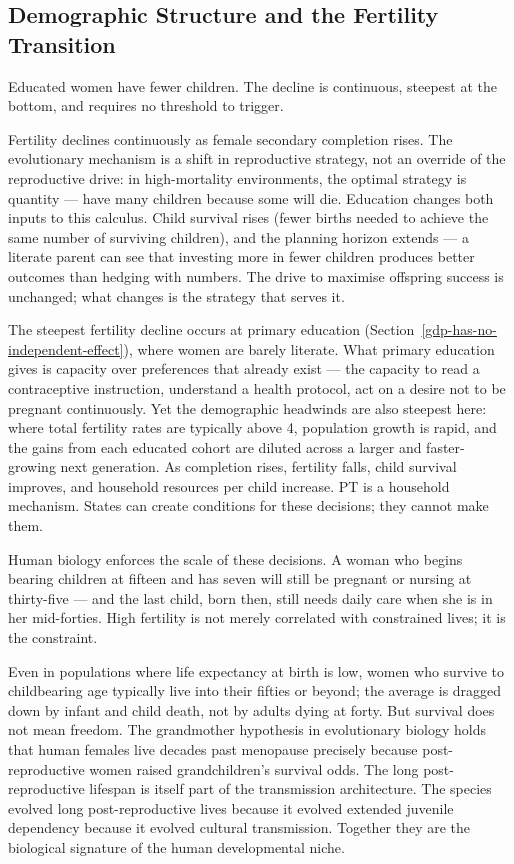 \documentclass[12pt,letterpaper]{article}
\begin{document}
\subsection{Demographic Structure and the Fertility Transition}\label{demographic-structure-and-the-fertility-transition}

Educated women have fewer children. The decline is continuous, steepest at the bottom, and requires no threshold to trigger.

Fertility declines continuously as female secondary
completion rises. The evolutionary mechanism is a shift in reproductive
strategy, not an override of the reproductive drive: in high-mortality
environments, the optimal strategy is quantity --- have many children
because some will die. Education changes both inputs to this calculus.
Child survival rises (fewer births needed to achieve the same number of
surviving children), and the planning horizon extends --- a literate
parent can see that investing more in fewer children produces better
outcomes than hedging with numbers. The drive to maximise offspring
success is unchanged; what changes is the strategy that serves it.

The steepest fertility decline occurs at primary education
(Section~\ref{gdp-has-no-independent-effect}), where women are barely
literate. What primary education gives is capacity over preferences that
already exist --- the capacity to read a contraceptive instruction,
understand a health protocol, act on a desire not to be pregnant
continuously. Yet the demographic headwinds are also steepest here:
where total fertility rates are typically above 4, population growth is
rapid, and the gains from each educated cohort are diluted across a
larger and faster-growing next generation. As completion rises, fertility
falls, child survival improves, and household resources per child
increase. PT is a
household mechanism. States can create conditions for these decisions; they
cannot make them.

Human biology enforces the scale of these decisions. A woman who begins
bearing children at fifteen and has seven will still be pregnant or
nursing at thirty-five --- and the last child, born then, still needs
daily care when she is in her mid-forties. High fertility is not merely
correlated with constrained lives; it is the constraint.

Even in populations where life expectancy at birth is low, women who
survive to childbearing age typically live into their fifties or beyond;
the average is dragged down by infant and child death, not by adults
dying at forty. But survival does not mean freedom. The grandmother
hypothesis in evolutionary biology holds that human females live decades
past menopause precisely because post-reproductive women raised
grandchildren's survival odds. The long post-reproductive lifespan is
itself part of the transmission architecture. The species
evolved long post-reproductive lives because it evolved extended
juvenile dependency because it evolved cultural transmission. Together
they are the biological signature of the human developmental niche.
\end{document}
